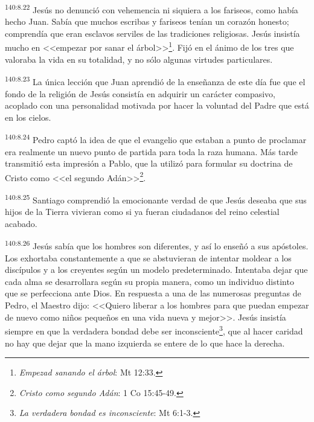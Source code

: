 \par 
\textsuperscript{140:8.22} Jesús no denunció con vehemencia ni siquiera a los fariseos, como había hecho Juan. Sabía que muchos escribas y fariseos tenían un corazón honesto; comprendía que eran esclavos serviles de las tradiciones religiosas. Jesús insistía mucho en <<empezar por sanar el árbol>>\footnote{\textit{Empezad sanando el árbol}: Mt 12:33.}. Fijó en el ánimo de los tres que valoraba la vida en su totalidad, y no sólo algunas virtudes particulares.

\par 
\textsuperscript{140:8.23} La única lección que Juan aprendió de la enseñanza de este día fue que el fondo de la religión de Jesús consistía en adquirir un carácter compasivo, acoplado con una personalidad motivada por hacer la voluntad del Padre que está en los cielos.

\par 
\textsuperscript{140:8.24} Pedro captó la idea de que el evangelio que estaban a punto de proclamar era realmente un nuevo punto de partida para toda la raza humana. Más tarde transmitió esta impresión a Pablo, que la utilizó para formular su doctrina de Cristo como <<el segundo Adán>>\footnote{\textit{Cristo como segundo Adán}: 1 Co 15:45-49.}.

\par 
\textsuperscript{140:8.25} Santiago comprendió la emocionante verdad de que Jesús deseaba que sus hijos de la Tierra vivieran como si ya fueran ciudadanos del reino celestial acabado.

\par 
\textsuperscript{140:8.26} Jesús sabía que los hombres son diferentes, y así lo enseñó a sus apóstoles. Los exhortaba constantemente a que se abstuvieran de intentar moldear a los discípulos y a los creyentes según un modelo predeterminado. Intentaba dejar que cada alma se desarrollara según su propia manera, como un individuo distinto que se perfecciona ante Dios. En respuesta a una de las numerosas preguntas de Pedro, el Maestro dijo: <<Quiero liberar a los hombres para que puedan empezar de nuevo como niños pequeños en una vida nueva y mejor>>. Jesús insistía siempre en que la verdadera bondad debe ser inconsciente\footnote{\textit{La verdadera bondad es inconsciente}: Mt 6:1-3.}, que al hacer caridad no hay que dejar que la mano izquierda se entere de lo que hace la derecha.

